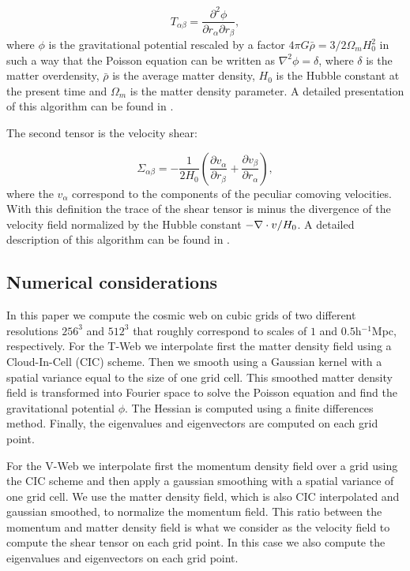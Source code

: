 \documentclass[useAMS,usenatbib]{mn2e}
\begin{document}
\begin{equation}
T_{\alpha\beta} = \frac{\partial^2\phi}{\partial
  r_{\alpha}\partial r_{\beta}},
\end{equation}
%
where $\phi$ is the gravitational potential rescaled by a factor $4\pi
G\bar{\rho}=3/2\Omega_m H_{0}^2$ in such a way that the Poisson
equation can be written as $\nabla^{2}\phi  = \delta$, where $\delta$
is the matter overdensity, $\bar{\rho}$ is the average matter density,
$H_{0}$ is the Hubble constant at the present time and $\Omega_m$ is the
matter density parameter. A detailed presentation of this algorithm
can be found in \cite{Tweb}.

The second tensor is the velocity shear:

\begin{equation}
\Sigma_{\alpha\beta} = -\frac{1}{2H_{0}}\left(\frac{\partial
  v_{\alpha}}{\partial r_{\beta}}+ \frac{\partial v_{\beta}}{\partial
  r_{\alpha}}\right),
\end{equation}
%
where the $v_{\alpha}$ correspond to the components of the peculiar
comoving velocities. With this definition the trace of the shear
tensor is minus the divergence of the velocity field normalized by the
Hubble constant $-\nabla\cdot {\bf}v /H_{0}$. A detailed description
of this algorithm can be found in \cite{Vweb}.

\subsection{Numerical considerations}

In this paper we compute the cosmic web on cubic grids of two different
resolutions $256^3$ and $512^3$ that roughly correspond
to scales of $1$ and $0.5$h$^{-1}$Mpc, respectively. For the T-Web we
interpolate first the matter density field using a Cloud-In-Cell (CIC)
scheme. Then we smooth using a Gaussian kernel with a spatial variance
equal to the size of one grid cell. This smoothed matter density field is
transformed into Fourier space to solve the Poisson equation and find
the gravitational potential $\phi$. The Hessian is computed using a finite
differences method. Finally, the eigenvalues and eigenvectors are
computed on each grid point.

For the V-Web we interpolate first the momentum density field over a
grid using the CIC scheme and then apply a gaussian smoothing with a
spatial variance of one grid cell. We use the matter density field,
which is also CIC interpolated and gaussian smoothed, to normalize the
momentum field. This ratio between the momentum and matter density
field is what we consider as the velocity field to compute the shear
tensor on each grid point. In this case we also compute the
eigenvalues and eigenvectors on each grid point.
\end{document}
